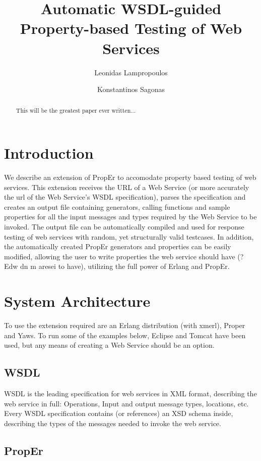 \documentclass[submission,copyright,a4]{eptcs}
\title{Automatic WSDL-guided Property-based Testing of Web Services}
\author{Leonidas Lampropoulos \and Konstantinos Sagonas}
\begin{document}
\maketitle

\begin{abstract}
 This will be the greatest paper ever written...
\end{abstract}

\section{Introduction}

We describe an extension of PropEr to accomodate property based testing of web services. This extension receives the URL of a Web Service (or more accurately the url of the Web Service's WSDL specification), parses the specification and creates an output file containing generators, calling functions and sample properties for all the input messages and types required by the Web Service to be invoked. The output file can be automatically compiled and used for response testing of web services with random, yet structurally valid testcases. In addition, the automatically created PropEr generators and properties can be easily modified, allowing the user to write properties the web service should have (? Edw dn m aresei to have), utilizing the full power of Erlang and PropEr.

\section{System Architecture}

To use the extension required are an Erlang distribution (with xmerl), Proper and Yaws.
To run some of the examples below, Eclipse and Tomcat have been used, but any means of creating a Web Service should be an option.

\subsection{WSDL}

WSDL is the leading specification for web services in XML format, describing the web service in full: Operations, Input and output message types, locations, etc. Every WSDL specification contains (or references) an XSD schema inside, describing the types of the messages needed to invoke the web service. 

\subsection{PropEr}
\end{document}
